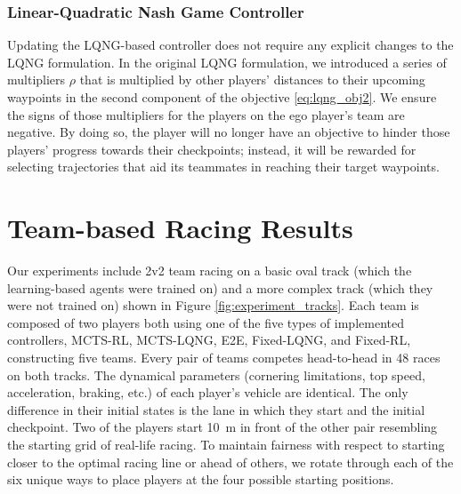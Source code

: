 \subsubsection{Linear-Quadratic Nash Game Controller}
Updating the LQNG-based controller does not require any explicit changes to the LQNG formulation. In the original LQNG formulation, we introduced a series of multipliers $\rho$ that is multiplied by other players' distances to their upcoming waypoints in the second component of the objective \eqref{eq:lqng_obj2}. We ensure the signs of those multipliers for the players on the ego player's team are negative. By doing so, the player will no longer have an objective to hinder those players' progress towards their checkpoints; instead, it will be rewarded for selecting trajectories that aid its teammates in reaching their target waypoints. 

\section{Team-based Racing Results}
Our experiments include 2v2 team racing on a basic oval track (which the learning-based agents were trained on) and a more complex track (which they were not trained on) shown in Figure \ref{fig:experiment_tracks}. Each team is composed of two players both using one of the five types of implemented controllers, MCTS-RL, MCTS-LQNG, E2E, Fixed-LQNG, and Fixed-RL, constructing five teams. Every pair of teams competes head-to-head in 48 races on both tracks. The dynamical parameters (cornering limitations, top speed, acceleration, braking, etc.) of each player's vehicle are identical. The only difference in their initial states is the lane in which they start and the initial checkpoint. Two of the players start \SI{10}{\meter} in front of the other pair resembling the starting grid of real-life racing. To maintain fairness with respect to starting closer to the optimal racing line or ahead of others, we rotate through each of the six unique ways to place players at the four possible starting positions.

